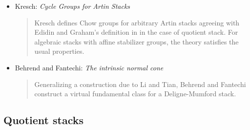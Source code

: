 \begin{itemize}
\begin{quote}
\end{quote}
\item
Kresch: \emph{Cycle Groups for Artin Stacks} \cite{kresch_cycle}
\begin{quote}
Kresch defines Chow groups for arbitrary Artin stacks agreeing with Edidin and
Graham's definition in \cite{edidin-graham} in the case of quotient stack. For
algebraic stacks with affine stabilizer groups, the theory satisfies the usual
properties.
\end{quote}
\item Behrend and Fantechi: \emph{The intrinsic normal cone}
\cite{behrend-fantechi}
\begin{quote}
Generalizing a construction due to Li and Tian, Behrend and Fantechi construct
a virtual fundamental class for a Deligne-Mumford stack.
\end{quote}
\end{itemize}


\subsection{Quotient stacks}
\label{subsection-quotient-stacks}

